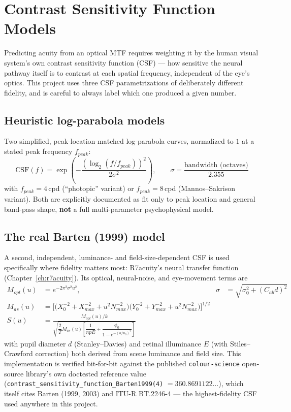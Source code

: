 \chapter{Contrast Sensitivity Function Models}
\label{ch:csf}

Predicting acuity from an optical MTF requires weighting it by the human visual
system's own contrast sensitivity function (CSF) --- how sensitive the neural pathway
itself is to contrast at each spatial frequency, independent of the eye's optics. This
project uses three CSF parametrizations of deliberately different fidelity, and is
careful to always label which one produced a given number.

\section{Heuristic log-parabola models}

Two simplified, peak-location-matched log-parabola curves, normalized to $1$ at a
stated peak frequency $f_{peak}$:
\begin{equation}
\text{CSF}(f) = \exp\!\left(-\frac{(\log_2(f/f_{peak}))^2}{2\sigma^2}\right), \qquad
\sigma = \frac{\text{bandwidth (octaves)}}{2.355}
\end{equation}
with $f_{peak}=4$\,cpd (``photopic'' variant) or $f_{peak}=8$\,cpd (Mannos--Sakrison
variant). Both are explicitly documented as fit only to peak location and general
band-pass shape, \textbf{not} a full multi-parameter psychophysical model.

\section{The real Barten (1999) model}

A second, independent, luminance- and field-size-dependent CSF is used specifically
where fidelity matters most: R7acuity's neural transfer function
(Chapter~\ref{ch:r7acuity}). Its optical, neural-noise, and eye-movement terms are
\begin{align}
M_{opt}(u) &= e^{-2\pi^2\sigma^2 u^2}, & \sigma &= \sqrt{\sigma_0^2 + (C_{ab}d)^2} \\
M_{as}(u) &= \Big[ \big(X_0^{-2}+X_{max}^{-2}+u^2 N_{max}^{-2}\big)\big(Y_0^{-2}+Y_{max}^{-2}+u^2 N_{max}^{-2}\big)\Big]^{1/2} \\
S(u) &= \frac{M_{opt}(u)/k}{\sqrt{\dfrac{2}{T} M_{as}(u)\left[\dfrac{1}{npE} + \dfrac{\phi_0}{1-e^{-(u/u_0)^2}}\right]}}
\end{align}
with pupil diameter $d$ (Stanley--Davies) and retinal illuminance $E$ (with
Stiles--Crawford correction) both derived from scene luminance and field size. This
implementation is verified bit-for-bit against the published \texttt{colour-science}
open-source library's own doctested reference value
(\texttt{contrast\_sensitivity\_\allowbreak function\_\allowbreak Barten1999(4)} $=360.8691122\ldots$), which
itself cites Barten (1999, 2003) and ITU-R BT.2246-4 --- the highest-fidelity CSF used
anywhere in this project.

